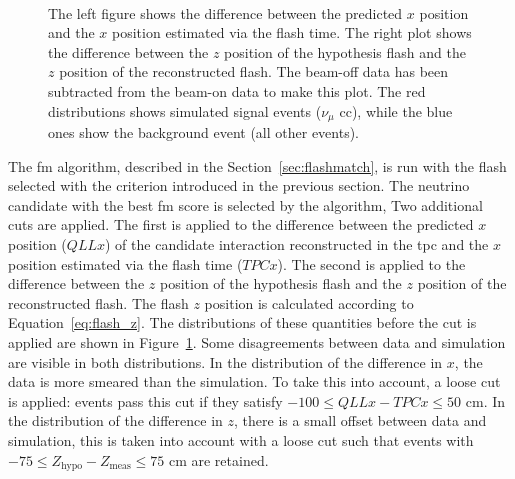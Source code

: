 \begin{figure}[]
\centering
{}
 \\ 
\caption[Flash Matching $\Delta x$ and $\Delta z$]{The left figure shows the difference between the predicted $x$ position and the $x$ position estimated via the flash time. The right plot shows the difference between the $z$ position of the hypothesis flash and the $z$ position of the reconstructed flash. The beam-off data has been subtracted from the beam-on data to make this plot. The red distributions shows simulated signal events ($\nu_\mu$ \acrshort{cc}), while the blue ones show the background event (all other events).}
\label{fig:fm_delta_beforesel}
\end{figure}

The \acrshort{fm} algorithm, described in the Section~\ref{sec:flashmatch}, is run with the flash selected with the criterion introduced in the previous section. The neutrino candidate with the best \acrshort{fm} score is selected by the algorithm, Two additional cuts are applied. The first is applied to the difference between the predicted $x$ position ($QLLx$) of the candidate interaction reconstructed in the \acrshort{tpc} and the $x$ position estimated via the flash time ($TPCx$). The second is applied to the difference between the $z$ position of the hypothesis flash and the $z$ position of the reconstructed flash. The flash $z$ position is calculated according to Equation~\eqref{eq:flash_z}. The distributions of these quantities before the cut is applied are shown in Figure~\ref{fig:fm_delta_beforesel}. Some disagreements between data and simulation are visible in both distributions. In the distribution of the difference in $x$, the data is more smeared than the simulation. To take this into account, a loose cut is applied: events pass this cut if they satisfy  $-100 \leq QLLx - TPCx \leq 50$ cm. In the distribution of the difference in $z$, there is a small offset between data and simulation, this is taken into account with a loose cut such that events with $-75 \leq Z_\text{hypo} - Z_\text{meas} \leq 75$ cm are retained.

